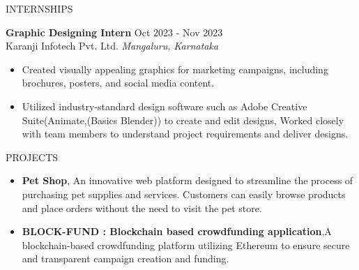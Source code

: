 \documentclass{resume} %
\begin{document}
\begin{rSection}{INTERNSHIPS}

\textbf{Graphic Designing Intern} \hfill Oct 2023 - Nov 2023\\
Karanji Infotech Pvt. Ltd. \hfill \textit{Mangaluru, Karnataka}
 \begin{itemize}
    \itemsep -3pt {} 
     \item Created visually appealing graphics for marketing campaigns, including brochures, posters, and social media content.
    \item Utilized industry-standard design software such as Adobe Creative Suite(Animate,(Basics Blender)) to create and edit designs, Worked closely with team members to understand project requirements and deliver designs. 
 \end{itemize}
 


\end{rSection} 


\begin{rSection}{PROJECTS}
\begin{itemize}
\item \textbf{Pet Shop}{, An innovative web platform designed to streamline the process of purchasing pet supplies and services. Customers can easily browse products and place orders without the need to visit the pet store.}
\item \textbf{BLOCK-FUND : Blockchain based crowdfunding application}{,A blockchain-based crowdfunding platform utilizing Ethereum to ensure secure and transparent campaign creation and funding.}
\end{itemize}

\end{rSection} 
\end{document}
